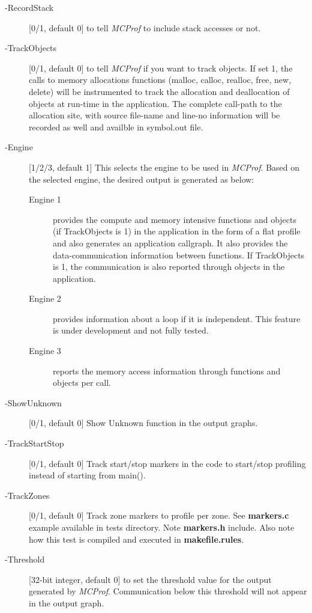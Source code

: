 \documentclass[10pt]{article}
\newcommand{\MCPROF}{\emph{MCProf}}
\begin{document}
\begin{description}

\item [-RecordStack] [0/1, default 0] to tell \MCPROF{} to include stack accesses or not.

\item [-TrackObjects] [0/1, default 0] to tell \MCPROF{} if you want to track 
objects. If set 1, the calls to memory allocations functions (malloc, calloc, 
realloc, free, new, delete) will be instrumented to track the allocation and 
deallocation of objects at run-time in the application. The complete call-path 
to the allocation site, with source file-name and line-no information will be 
recorded as well and availble in symbol.out file.

\item [-Engine] [1/2/3, default 1] This selects the engine to be used in
    \MCPROF{}.  Based on the selected engine, the desired output is generated as
    below:

    \begin{description}

    \item [Engine 1]    provides the compute and memory intensive functions and
        objects (if TrackObjects is 1) in the application in the form of a flat
        profile and also generates an application callgraph. It also provides the
        data-communication information between functions. If TrackObjects is 1,
        the communication is also reported through objects in the application.

    \item [Engine 2]    provides information about a loop if it is independent.
        This feature is under development and not fully tested.

    \item [Engine 3]    reports the memory access information through functions
        and objects per call.

    \end{description}

\item [-ShowUnknown]  [0/1, default 0] Show Unknown function in the output graphs.

\item [-TrackStartStop] [0/1, default 0] Track start/stop markers in the code to
    start/stop profiling instead of starting from main().

\item [-TrackZones] [0/1, default 0] Track zone markers to profile per zone. See
    \textbf{markers.c} example available in tests directory. Note \textbf{markers.h}
    include. Also note how this test is compiled and executed in \textbf{makefile.rules}.

\item [-Threshold] [32-bit integer, default 0] to set the threshold value for the 
    output generated by \MCPROF{}. Communication below this threshold will not appear
    in the output graph.

\end{description}
\end{document}

